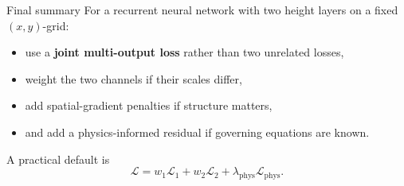 \documentclass[aspectratio=169]{beamer}
\begin{document}
\begin{frame}{Final summary}
For a recurrent neural network with two height layers on a fixed \((x,y)\)-grid:
\begin{itemize}
\item use a \textbf{joint multi-output loss} rather than two unrelated losses,
\item weight the two channels if their scales differ,
\item add spatial-gradient penalties if structure matters,
\item and add a physics-informed residual if governing equations are known.
\end{itemize}

A practical default is
\[
\mathcal{L}
=
w_1\mathcal{L}_1 + w_2\mathcal{L}_2 + \lambda_{\mathrm{phys}}\mathcal{L}_{\mathrm{phys}}.
\]
\end{frame}
\end{document}
